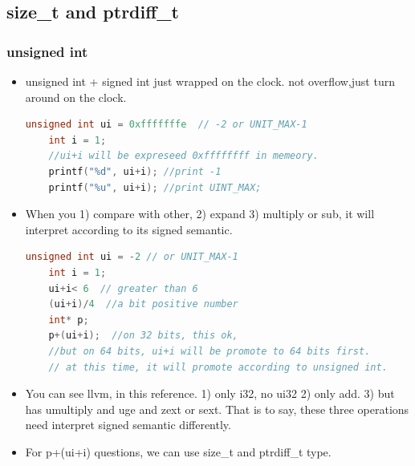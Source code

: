 \documentclass[a4paper,11pt,twoside]{book}
\begin{document}
\subsection{size\_t and ptrdiff\_t}

\subsubsection{unsigned int}
\begin{itemize}
	\item unsigned int + signed int just wrapped on the clock. not overflow,just turn around on the clock. 
	
	\begin{lstlisting}[frame=single, language=c++]
	unsigned int ui = 0xfffffffe  // -2 or UNIT_MAX-1
	int i = 1;
	//ui+i will be expreseed 0xffffffff in memeory. 
	printf("%d", ui+i); //print -1
	printf("%u", ui+i); //print UINT_MAX;
	\end{lstlisting}
	
	\item When you 1) compare with other, 2) expand 3) multiply or sub, it will interpret according to its signed semantic. 
	\begin{lstlisting}[frame=single, language=c++]
	unsigned int ui = -2 // or UNIT_MAX-1
	int i = 1;
	ui+i< 6  // greater than 6
	(ui+i)/4  //a bit positive number
	int* p;
	p+(ui+i);  //on 32 bits, this ok, 
	//but on 64 bits, ui+i will be promote to 64 bits first.
	// at this time, it will promote according to unsigned int.
	\end{lstlisting}
	
	\item You can see llvm, in this reference. 1) only i32, no ui32 2) only add.  3) but has umultiply and uge and zext or sext. That is to say, these three operations need interpret signed semantic differently. 
	
	\item For p+(ui+i) questions, we can use size\_t and ptrdiff\_t type. 
\end{itemize}
\end{document}
